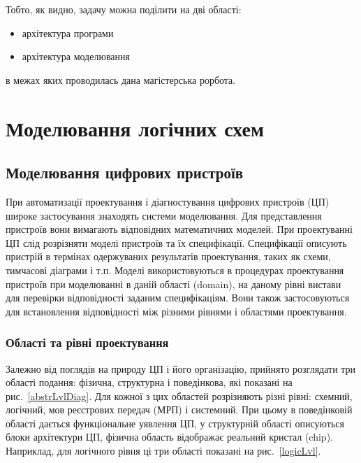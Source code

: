 \documentclass[12pt,a4paper]{article}
\begin{document}
Тобто, як видно, задачу можна поділити на дві області:
\begin{itemize}
  \item архітектура програми
  \item архітектура моделювання
\end{itemize}
в межах яких проводилась дана магістерська рорбота.

\clearpage

\section{Моделювання логічних схем}

\subsection{Моделювання цифрових пристроїв}
При автоматизації проектування і діагностування цифрових пристроїв (ЦП) широке застосування знаходять системи моделювання. Для представлення пристроїв вони вимагають відповідних математичних моделей. При проектуванні ЦП слід розрізняти моделі пристроїв та їх специфікації. Специфікації описують пристрій в термінах одержуваних результатів проектування, таких як схеми, тимчасові діаграми і т.п. Моделі використовуються в процедурах проектування пристроїв при моделюванні в даній області (domain), на даному рівні вистави для перевірки відповідності заданим специфікаціям. Вони також застосовуються для встановлення відповідності між різними рівнями і областями проектування.

\subsubsection{Області та рівні проектування}
Залежно від поглядів на природу ЦП і його організацію, прийнято розглядати три області подання: фізична, структурна і поведінкова, які показані на рис.~\ref{abstrLvlDiag}. Для кожної з цих областей розрізняють різні рівні: схемний, логічний, мов реєстрових передач (МРП) і системний. При цьому в поведінковій області дається функціональне уявлення ЦП, у структурній області описуються блоки архітектури ЦП, фізична область відображає реальний кристал (chip). Наприклад, для логічного рівня ці три області показані на рис.~\ref{logicLvl}.
\end{document}
